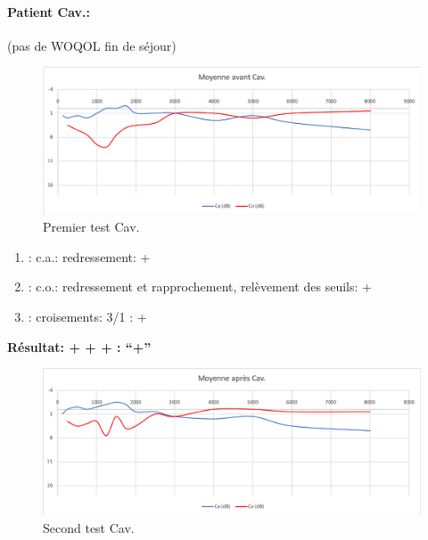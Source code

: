 \clearpage

\paragraph{ Patient Cav.: }

(pas de WOQOL fin de séjour)
\begin{figure}%
\centering
\includegraphics[width=1\linewidth]{images/graphiques/cav_pre.png}
\caption[Patient Cav. : 1° test]{Premier test Cav.}

\end{figure}

	\begin{enumerate}

 		\item : c.a.: redressement: +

 		\item : c.o.: redressement et rapprochement, relèvement des seuils: +
 		\item : croisements: 3/1 :  +

                \end{enumerate}

                \textbf{ Résultat:  + + +       : ``+''}

                \begin{figure}%
\centering
\includegraphics[width=1\linewidth]{images/graphiques/cav_post.png}
\caption[Patient Cav. : 2° test]{Second test Cav.}

                \end{figure}
